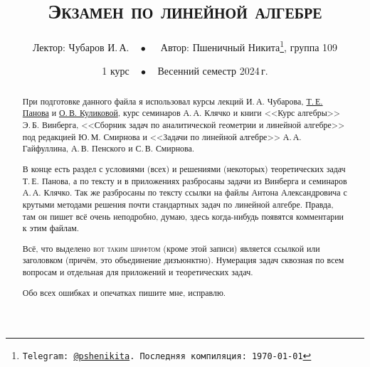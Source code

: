 \documentclass[a4paper, 11pt]{article}
\begin{document}
\title{\bfseries\scshape Экзамен по линейной алгебре}
\date{1 курс$\quad\bullet\quad$Весенний семестр 2024\,г.}
\author{Лектор: Чубаров И.\,А.$\quad\bullet\quad$ Автор: Пшеничный Никита\thanks{\texttt{Telegram: \href{https://t.me/pshenikita}{@pshenikita}. Последняя компиляция: \today}}, группа 109}

\maketitle

\begin{abstract}
    При подготовке данного файла я использовал курсы лекций И.\,А. Чубарова, \href{http://higeom.math.msu.su/people/taras/#teaching}{Т.\,Е. Панова} и \href{http://halgebra.math.msu.su/wiki/lib/exe/fetch.php/28_lectures_02_06_20_.pdf}{О.\,В. Куликовой}, курс семинаров А.\,А. Клячко и книги <<Курс алгебры>> Э.\,Б. Винберга, <<Сборник задач по аналитической геометрии и линейной алгебре>> под редакцией Ю.\,М. Смирнова и <<Задачи по линейной алгебре>> А.\,А. Гайфуллина, А.\,В. Пенского и С.\,В. Смирнова.

    В конце есть раздел с условиями (всех) и решениями (некоторых) теоретических задач Т.\,Е. Панова, а по тексту и в приложениях разбросаны задачи из Винберга и семинаров А.\,А. Клячко. Так же разбросаны по тексту ссылки на файлы Антона Александровича с крутыми методами решения почти стандартных задач по линейной алгебре. Правда, там он пишет всё очень неподробно, думаю, здесь когда-нибудь появятся комментарии к этим файлам.

    Всё, что выделено {\scshape вот таким шрифтом} (кроме этой записи) является ссылкой или заголовком (причём, это объединение дизъюнктно). Нумерация задач сквозная по всем вопросам и отдельная для приложений и теоретических задач.

    Обо всех ошибках и опечатках пишите мне, исправлю.
\end{abstract}

\tableofcontents

\newpage
\end{document}

